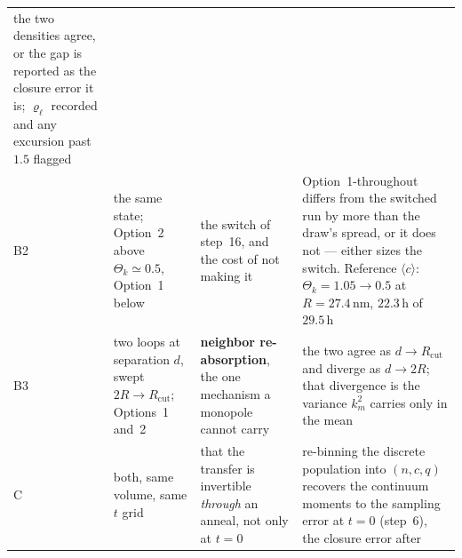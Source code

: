 \documentclass{article}
\newcommand{\cloop}{\ensuremath{\langle c\rangle}}
\begin{document}
{\begin{xltabular}{\textwidth}{@{}l X X X@{}}
     the two densities agree, or the gap is reported as the closure error it is;
     $\varrho_\ell$ recorded and any excursion past $1.5$ flagged \\
\addlinespace
B2 & the same state; Option~2 above $\Theta_k\simeq0.5$, Option~1 below &
     the switch of step~16, and the cost of not making it &
     Option~1-throughout differs from the switched run by more than the draw's
     spread, or it does not --- either sizes the switch. Reference \cloop{}:
     $\Theta_k=1.05\to0.5$ at $R=27.4\,$nm, $22.3\,$h of $29.5\,$h \\
\addlinespace
B3 & two loops at separation $d$, swept $2R\to R_{\mathrm{cut}}$; Options~1
     and~2 &
     \textbf{neighbor re-absorption}, the one mechanism a monopole cannot carry &
     the two agree as $d\to R_{\mathrm{cut}}$ and diverge as $d\to2R$; that
     divergence is the variance $k^2_m$ carries only in the mean \\
\addlinespace
C & both, same volume, same $t$ grid &
    that the transfer is invertible \emph{through} an anneal, not only at $t=0$ &
    re-binning the discrete population into $(n,c,q)$ recovers the continuum
    moments to the sampling error at $t=0$ (step~6), the closure error after \\
\end{xltabular}
}
\end{document}
